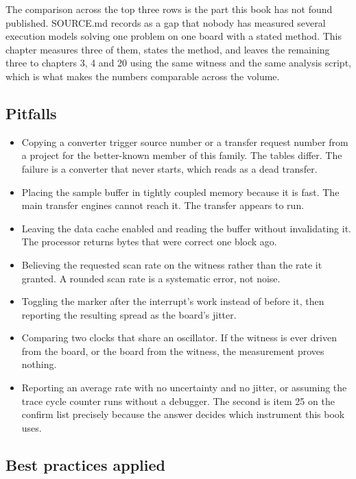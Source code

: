 The comparison across the top three rows is the part this book has not found
published. SOURCE.md records as a gap that nobody has measured several execution
models solving one problem on one board with a stated method. This chapter
measures three of them, states the method, and leaves the remaining three to
chapters 3, 4 and 20 using the same witness and the same analysis script, which
is what makes the numbers comparable across the volume.

\subsection*{Pitfalls}

\begin{itemize}
\item Copying a converter trigger source number or a transfer request number
from a project for the better-known member of this family. The tables differ.
The failure is a converter that never starts, which reads as a dead transfer.
\item Placing the sample buffer in tightly coupled memory because it is fast.
The main transfer engines cannot reach it. The transfer appears to run.
\item Leaving the data cache enabled and reading the buffer without
invalidating it. The processor returns bytes that were correct one block ago.
\item Believing the requested scan rate on the witness rather than the rate it
granted. A rounded scan rate is a systematic error, not noise.
\item Toggling the marker after the interrupt's work instead of before it, then
reporting the resulting spread as the board's jitter.
\item Comparing two clocks that share an oscillator. If the witness is ever
driven from the board, or the board from the witness, the measurement proves
nothing.
\item Reporting an average rate with no uncertainty and no jitter, or assuming
the trace cycle counter runs without a debugger. The second is item 25 on the
confirm list precisely because the answer decides which instrument this book
uses.
\end{itemize}

\subsection*{Best practices applied}

